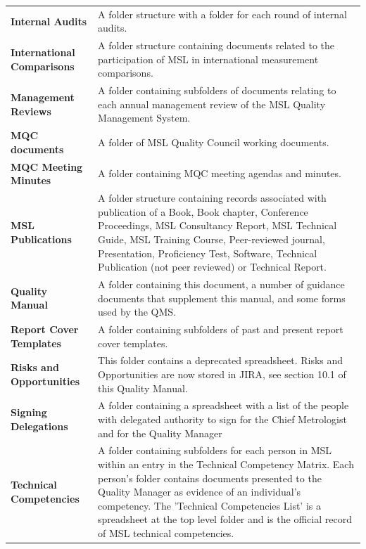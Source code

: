 {\begin{longtable}{p{14.07em}p{25em}}
\textbf{Internal Audits} & A folder structure with a folder for each round of internal audits. \\

\textbf{International Comparisons} & A folder structure containing documents related to the participation of MSL in international measurement comparisons. \\

\textbf{Management Reviews} & A folder containing subfolders of documents relating to each annual management review of the MSL Quality Management System. \\

\textbf{MQC documents} & A folder of MSL Quality Council working documents. \\

\textbf{MQC Meeting Minutes} & A folder containing MQC meeting agendas and minutes. \\

\textbf{MSL Publications} & A folder structure containing records associated with publication of a Book, Book chapter, Conference Proceedings, MSL Consultancy Report, MSL Technical Guide, MSL Training Course, Peer-reviewed journal, Presentation, Proficiency Test, Software, Technical Publication (not peer reviewed) or Technical Report. \\

\textbf{Quality Manual} & A folder containing this document, a number of guidance documents that supplement this manual, and some forms used by the QMS. \\

\textbf{Report Cover Templates} & A folder containing subfolders of past and present report cover templates. \\

\textbf{Risks and Opportunities} & This folder contains a deprecated spreadsheet. Risks and Opportunities are now stored in JIRA, see section 10.1 of this Quality Manual. \\

\textbf{Signing Delegations} & A folder containing a spreadsheet with a list of the people with delegated authority to sign for the Chief Metrologist and for the Quality Manager \\

\textbf{Technical Competencies} & A folder containing subfolders for each person in MSL within an entry in the Technical Competency Matrix. Each person's folder contains documents presented to the Quality Manager as evidence of an individual's competency. The 'Technical Competencies List' is a spreadsheet at the top level folder and is the official record of MSL technical competencies. \\


\end{longtable}}
